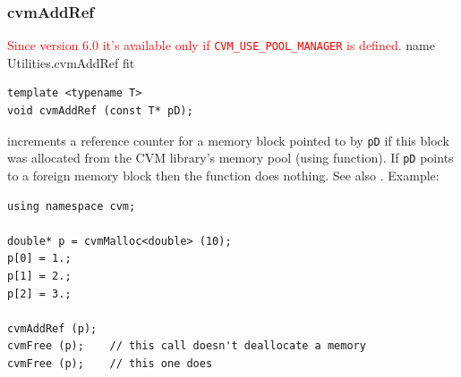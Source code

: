 \subsubsection{cvmAddRef}
\textcolor{red}{Since version 6.0 it's available only if \texttt{CVM\_USE\_POOL\_MANAGER} is defined.}%
\pdfdest name {Utilities.cvmAddRef} fit
\begin{verbatim}
template <typename T>
void cvmAddRef (const T* pD);
\end{verbatim}
increments a reference counter for a memory block pointed to
by \verb"pD" if this block was allocated from the CVM library's
memory pool (using  function).
If \verb"pD" points to a foreign memory block then
the function does nothing.
See also .
Example:
\begin{Verbatim}
using namespace cvm;

double* p = cvmMalloc<double> (10);
p[0] = 1.;
p[1] = 2.;
p[2] = 3.;

cvmAddRef (p);
cvmFree (p);    // this call doesn't deallocate a memory
cvmFree (p);    // this one does
\end{Verbatim}
\newpage




